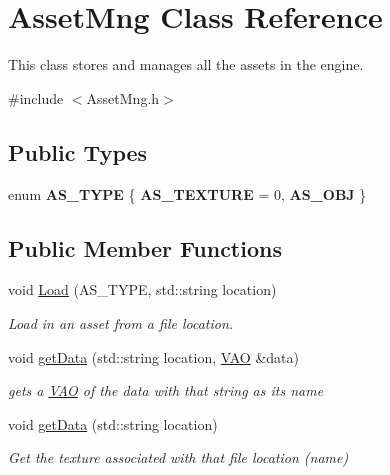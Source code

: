 \hypertarget{class_asset_mng}{\section{Asset\-Mng Class Reference}
\label{class_asset_mng}
}


This class stores and manages all the assets in the engine.  




{\ttfamily \#include $<$Asset\-Mng.\-h$>$}

\subsection*{Public Types}
\begin{DoxyCompactItemize}
\item 
enum {\bfseries A\-S\-\_\-\-T\-Y\-P\-E} \{ {\bfseries A\-S\-\_\-\-T\-E\-X\-T\-U\-R\-E} = 0, 
{\bfseries A\-S\-\_\-\-O\-B\-J}
 \}
\end{DoxyCompactItemize}
\subsection*{Public Member Functions}
\begin{DoxyCompactItemize}
\item 
void \hyperlink{class_asset_mng_acd178c7a87bd71842e3af302c79983dd}{Load} (A\-S\-\_\-\-T\-Y\-P\-E, std\-::string location)
\begin{DoxyCompactList}\small\item\em Load in an asset from a file location. \end{DoxyCompactList}\item 
void \hyperlink{class_asset_mng_a2301ce67cfccde7ada003e61ff3cab4f}{get\-Data} (std\-::string location, \hyperlink{class_v_a_o}{V\-A\-O} \&data)
\begin{DoxyCompactList}\small\item\em gets a \hyperlink{class_v_a_o}{V\-A\-O} of the data with that string as its name \end{DoxyCompactList}\item 
void \hyperlink{class_asset_mng_a431fb64b5423f187ff2902eebfdcf654}{get\-Data} (std\-::string location)
\begin{DoxyCompactList}\small\item\em Get the texture associated with that file location (name) \end{DoxyCompactList}\end{DoxyCompactItemize}


